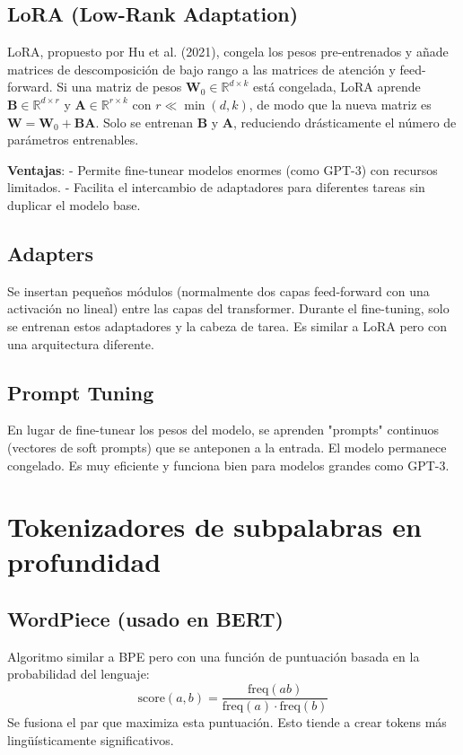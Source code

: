 \documentclass[12pt,a4paper,openany,oneside]{book}
\begin{document}
\subsection{LoRA (Low-Rank Adaptation)}
LoRA, propuesto por Hu et al. (2021), congela los pesos pre-entrenados y añade matrices de descomposición de bajo rango a las matrices de atención y feed-forward. Si una matriz de pesos \(\mathbf{W}_0 \in \mathbb{R}^{d \times k}\) está congelada, LoRA aprende \(\mathbf{B} \in \mathbb{R}^{d \times r}\) y \(\mathbf{A} \in \mathbb{R}^{r \times k}\) con \(r \ll \min(d,k)\), de modo que la nueva matriz es \(\mathbf{W} = \mathbf{W}_0 + \mathbf{B}\mathbf{A}\). Solo se entrenan \(\mathbf{B}\) y \(\mathbf{A}\), reduciendo drásticamente el número de parámetros entrenables.

\textbf{Ventajas}:
- Permite fine-tunear modelos enormes (como GPT-3) con recursos limitados.
- Facilita el intercambio de adaptadores para diferentes tareas sin duplicar el modelo base.

\subsection{Adapters}
Se insertan pequeños módulos (normalmente dos capas feed-forward con una activación no lineal) entre las capas del transformer. Durante el fine-tuning, solo se entrenan estos adaptadores y la cabeza de tarea. Es similar a LoRA pero con una arquitectura diferente.

\subsection{Prompt Tuning}
En lugar de fine-tunear los pesos del modelo, se aprenden "prompts" continuos (vectores de soft prompts) que se anteponen a la entrada. El modelo permanece congelado. Es muy eficiente y funciona bien para modelos grandes como GPT-3.

\section{Tokenizadores de subpalabras en profundidad}

\subsection{WordPiece (usado en BERT)}
Algoritmo similar a BPE pero con una función de puntuación basada en la probabilidad del lenguaje:
\[
\text{score}(a,b) = \frac{\text{freq}(ab)}{\text{freq}(a) \cdot \text{freq}(b)}
\]
Se fusiona el par que maximiza esta puntuación. Esto tiende a crear tokens más lingüísticamente significativos.
\end{document}
